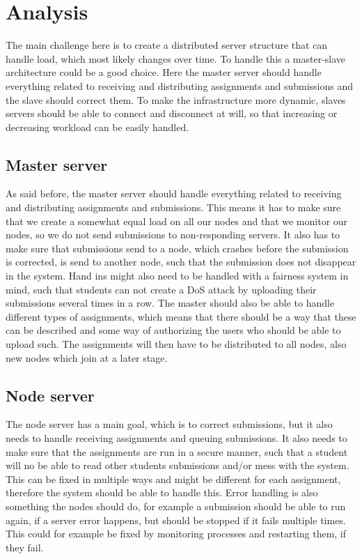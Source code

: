 \chapter{Analysis}
The main challenge here is to create a distributed server structure that can
handle load, which most likely changes over time. To handle this a master-slave
architecture could be a good choice. Here the master server should handle
everything related to receiving and distributing assignments and submissions and
the slave should correct them. To make the infrastructure more dynamic, slaves
servers should be able to connect and disconnect at will, so that increasing or
decreasing workload can be easily handled.

\section{Master server}
As said before, the master server should handle everything related to receiving
and distributing assignments and submissions. This means it has to make sure that we
create a somewhat equal load on all our nodes and that we monitor our nodes, so
we do not send submissions to non-responding servers. It also has to make sure
that submissions send to a node, which crashes before the submission is corrected,
is send to another node, such that the submission does not disappear in the
system.
Hand ins might also need to be handled with a fairness system in mind, such that
students can not create a DoS attack by uploading their submissions several
times in a row.
The master should also be able to handle different types of assignments, which
means that there should be a way that these can be described and some way of
authorizing the users who should be able to upload such.
The assignments will then have to be distributed to all nodes, also new nodes
which join at a later stage.

\section{Node server}
The node server has a main goal, which is to correct submissions, but it also
needs to handle receiving assignments and queuing submissions. It also needs to
make sure that the assignments are run in a secure manner, such that a student
will no be able to read other students submissions and/or mess with the system.
This can be fixed in multiple ways and might be different for each assignment,
therefore the system should be able to handle this.
Error handling is also something the nodes should do, for example a submission
should be able to run again, if a server error happens, but should be stopped if
it fails multiple times. This could for example be fixed by monitoring processes
and restarting them, if they fail.

